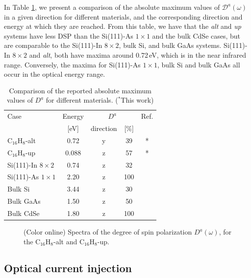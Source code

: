 \documentclass[pss]{wiley2sp} %
\begin{document}
In Table \ref{tab:dacomp}, we present a comparison of the absolute maximum
values of $\mathcal{D}^{a}(\omega)$ in a given direction for different
materials, and the corresponding direction and energy at which they are
reached. From this table, we have that the \emph{alt} and \emph{up} systems
have less DSP than the Si(111)-As $1\times1$ and the bulk CdSe cases, but are
comparable to the Si(111)-In $8\times2$, bulk Si, and bulk GaAs systems.
Si(111)-In $8\times2$ and \emph{alt}, both have maxima around 0.72\,eV, which
is in the near infrared range. Conversely, the maxima for Si(111)-As
$1\times1$, bulk Si and bulk GaAs all occur in the optical energy range.
\begin{table}[b]
\centering
\sidecaption
\begin{tabular}{lcccc}
\hline
\hline
Case & Energy &  \multicolumn{2}{c}{$D^{a}$} &  Ref.\\
\cline{3-4}   & [eV]   & direction & [\%] \\
\hline
C$_{16}$H$_{8}$-alt    & 0.72 & y & 39  & * \\
C$_{16}$H$_{8}$-up     & 0.088 & z & 57  & * \\
Si(111)-In $8\times2$  & 0.74 & z & 32  & \cite{arzatePRB14}\\
Si(111)-As $1\times1$  & 2.20 & z & 100 & \cite{mendozaPRB12}\\
Bulk Si                & 3.44 & z & 30  & \cite{nastosPRB07}\\
Bulk GaAs              & 1.50 & z & 50  & \cite{nastosPRB07,bhatPRB05}\\
Bulk CdSe              & 1.80 & z & 100 & \cite{nastosPRB07}\\
\hline
\hline
\end{tabular}
\caption[]{Comparison of the reported absolute maximum values of {$D^{a}$} for
different materials. ($^{*}$This work)}
\label{tab:dacomp}
\end{table}

\begin{figure}[t]
\hfill
{}
\caption{(Color online) Spectra of the degree of spin polarization
{$D^{a}(\omega)$}, for the C$_{16}$H$_{8}$-alt and
C$_{16}$H$_{8}$-up.\label{fig:Da}}
\end{figure}


\subsection{Optical current injection}\label{subsec:results-eta}
\end{document}
